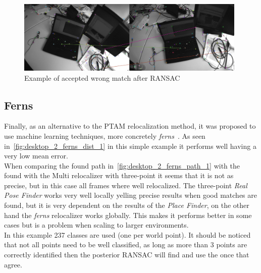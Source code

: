 \begin{figure}[htpb]
  \centering
  \includegraphics[width=11cm]{img/wrong_inlier.png}
  \caption{Example of accepted wrong match after RANSAC}
  \label{fig:wrong_inlier}
\end{figure}


\subsection{Ferns}
\label{sub:ferns_results}

Finally, as an alternative to the PTAM relocalization method, it was proposed to use machine learning techniques, more concretely \textit{ferns}~\cite{Ozuysal2010}. As seen in~\ref{fig:desktop_2_ferns_dist_1} in this simple example it performs well having a very low mean error.\\

When comparing the found path in~\ref{fig:desktop_2_ferns_path_1} with the found with the Multi relocalizer with three-point it seems that it is not as precise, but in this case all frames where well relocalized. The three-point \textit{Real Pose Finder} works very well locally yelling precise results when good matches are found, but it is very dependent on the results of the \textit{Place Finder}, on the other hand the \textit{ferns} relocalizer works globally. This makes it performs better in some cases but is a problem when scaling to larger environments.\\

In this example 237 classes are used (one per world point). It should be noticed that not all points need to be well classified, as long as more than 3 points are correctly identified then the posterior RANSAC will find and use the once that agree.\\


